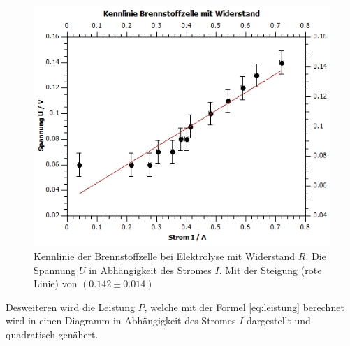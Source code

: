 \documentclass[12pt,a4paper,twoside]{article}
\begin{document}
\begin{figure}[H]
    \centering
    \includegraphics[width=0.6\linewidth]{nudes/brennstoff diagramm mit r.jpg}
    \caption{Kennlinie der Brennstoffzelle bei Elektrolyse mit Widerstand $R$. Die Spannung $U$ in Abhängigkeit des Stromes $I$. Mit der Steigung (rote Linie) von $(0.142 \pm 0.014)$}
    \label{fig:diagramm Brennstoffzelle mit R}
\end{figure}

\noindent
Desweiteren wird die Leistung $P$, welche mit der Formel \ref{eq:leistung} berechnet wird in einen Diagramm in Abhängigkeit des Stromes $I$ dargestellt und quadratisch genähert. 
\end{document}
